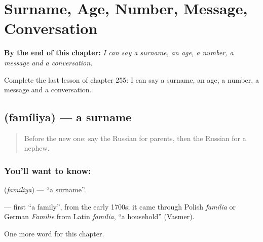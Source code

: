 
\chapter{Surname, Age, Number, Message, Conversation}
\label{ch:ru-surname-age-number-message-conversation}

\begin{chapteropening}
\textbf{By the end of this chapter:} \emph{I can say a surname, an age, a number, a message and a conversation.}

Complete the last lesson of chapter 255: I can say a surname, an age, a number, a message and a conversation.
\end{chapteropening}

\section[\texorpdfstring{\ru{фамилия} (famíliya)}{фамилия (famíliya)}]{ (famíliya) — a surname}

\label{lesson:RU-C255-familiya}



\begin{quote}
Before the new one: say the Russian for parents, then the Russian for a nephew.
\end{quote}

\subsection*{You'll want to know: }
\textbf{} (\emph{famíliya}) — \textquotedblleft{}a surname\textquotedblright{}.

\begin{cousinweb}
\textbf{} — first \textquotedblleft{}a family\textquotedblright{}, from the early 1700s; it came through Polish \emph{familia} or German \emph{Familie} from Latin \emph{familia}, \textquotedblleft{}a household\textquotedblright{} (Vasmer).
\end{cousinweb}

\begin{grammarlens}[title={What you've built}]
One more word for this chapter.
\end{grammarlens}

